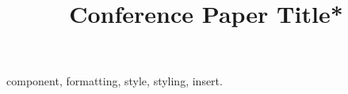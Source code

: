 \documentclass[conference]{IEEEtran}
\begin{document}
\renewcommand{\figurename}{Fig.} %

\title{Conference Paper Title*\\
}



\maketitle



\begin{IEEEkeywords}
    component, formatting, style, styling, insert.
\end{IEEEkeywords}




















\end{document}
